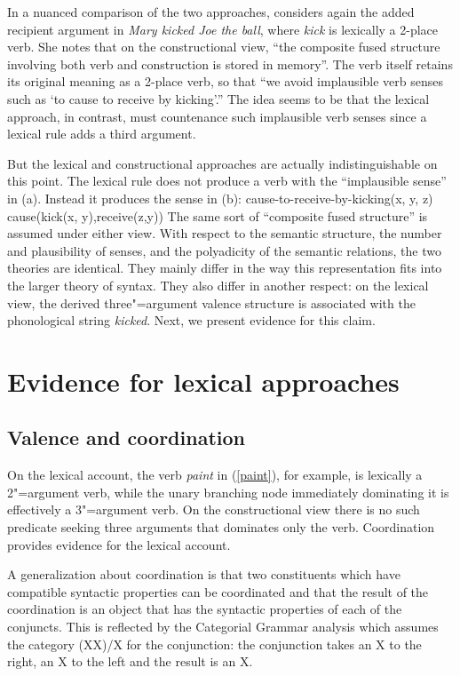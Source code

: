 In a nuanced comparison of the two approaches, \citet[--140]{Goldberg95a}
considers again the added recipient argument in \emph{Mary kicked Joe the ball}, where \emph{kick}
is lexically a 2-place verb.  She notes that on the constructional view, ``the composite fused
structure involving both verb and construction is stored in memory''.  
The verb itself retains its original meaning as a 2-place verb, so that ``we
avoid implausible verb senses such as `to cause to receive by kicking'.''  The idea seems to be that
the lexical approach, in contrast, must countenance such implausible verb senses since a lexical
rule adds a third argument.  

But the lexical and constructional approaches are actually indistinguishable on this point.  The lexical rule does not
produce a verb with the ``implausible sense'' in (a).  Instead it produces the sense in (b):
\eal
\ex cause-to-receive-by-kicking(x, y, z) 
\ex cause(kick(x, y),receive(z,y))
\zl
The same sort of ``composite fused structure'' is assumed under either view.  
With respect to the semantic structure, the number and plausibility of senses, and the polyadicity of the semantic relations, the two
theories are identical.  They mainly differ in the way this representation fits into the larger theory of syntax.  
They also differ in another respect: on the lexical view, the derived three"=argument valence
structure is associated with the phonological string
\emph{kicked}.  Next, we present evidence for this claim.
 

\section{Evidence for lexical approaches}

\subsection{Valence and coordination}
\label{coordination-sec}

On the lexical account, the verb \emph{paint} in (\ref{paint}), for example, is lexically a
2"=argument verb, while the unary branching node immediately dominating it is effectively a
3"=argument verb.  On the constructional view there is no such   predicate seeking three arguments
that dominates only the verb.  Coordination provides evidence for the lexical account.   

A generalization about coordination is that two constituents which have compatible syntactic
properties can be coordinated and that the result of the coordination is an object that has the
syntactic properties of each of the conjuncts. This is reflected by the
Categorial Grammar analysis which assumes the category (X\bs X)/X for the conjunction: the
conjunction takes an X to the right, an X to the left and the result is an X.

